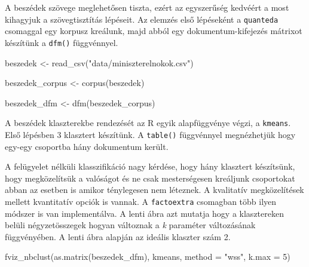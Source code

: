 \documentclass[
]{book}
\newenvironment{Shaded}{\begin{snugshade}}{\end{snugshade}}
\newcommand{\AttributeTok}[1]{\textcolor[rgb]{0.77,0.63,0.00}{#1}}
\newcommand{\CommentTok}[1]{\textcolor[rgb]{0.56,0.35,0.01}{\textit{#1}}}
\newcommand{\DecValTok}[1]{\textcolor[rgb]{0.00,0.00,0.81}{#1}}
\newcommand{\FunctionTok}[1]{\textcolor[rgb]{0.00,0.00,0.00}{#1}}
\newcommand{\NormalTok}[1]{#1}
\newcommand{\OtherTok}[1]{\textcolor[rgb]{0.56,0.35,0.01}{#1}}
\newcommand{\SpecialCharTok}[1]{\textcolor[rgb]{0.00,0.00,0.00}{#1}}
\newcommand{\StringTok}[1]{\textcolor[rgb]{0.31,0.60,0.02}{#1}}
\begin{document}
A beszédek szövege meglehetősen tiszta, ezért az egyszerűség kedvéért a
most kihagyjuk a szövegtisztítás lépéseit. Az elemzés első lépéseként a
\texttt{quanteda} csomaggal egy korpusz kreálunk, majd abból egy
dokumentum-kifejezés mátrixot készítünk a \texttt{dfm()} függvénnyel.

\begin{Shaded}
\begin{Highlighting}[]
\NormalTok{beszedek }\OtherTok{\textless{}{-}} \FunctionTok{read\_csv}\NormalTok{(}\StringTok{"data/miniszterelnokok.csv"}\NormalTok{)}

\NormalTok{beszedek\_corpus }\OtherTok{\textless{}{-}} \FunctionTok{corpus}\NormalTok{(beszedek)}

\NormalTok{beszedek\_dfm }\OtherTok{\textless{}{-}} \FunctionTok{dfm}\NormalTok{(beszedek\_corpus)}
\end{Highlighting}
\end{Shaded}

A beszédek klaszterekbe rendezését az R egyik alapfüggvénye végzi, a
\texttt{kmeans}. Első lépésben 3 klasztert készítünk. A \texttt{table()}
függvénnyel megnézhetjük hogy egy-egy csoportba hány dokumentum került.

\begin{Shaded}
\end{Shaded}

A felügyelet nélküli klasszifikáció nagy kérdése, hogy hány klasztert
készítsünk, hogy megközelítsük a valóságot és ne csak mesterségesen
kreáljunk csoportokat abban az esetben is amikor ténylegesen nem
léteznek. A kvalitatív megközelítések mellett kvantitatív opciók is
vannak. A \texttt{factoextra} csomagban több ilyen módszer is van
implementálva. A lenti ábra azt mutatja hogy a klasztereken belüli
négyzetösszegek hogyan változnak a \emph{k} paraméter változásának
függvényében. A lenti ábra alapján az ideális klaszter szám 2.

\begin{Shaded}
\begin{Highlighting}[]

\FunctionTok{fviz\_nbclust}\NormalTok{(}\FunctionTok{as.matrix}\NormalTok{(beszedek\_dfm), kmeans, }\AttributeTok{method =} \StringTok{"wss"}\NormalTok{, }\AttributeTok{k.max =} \DecValTok{5}\NormalTok{)}
\end{Highlighting}
\end{Shaded}
\end{document}
